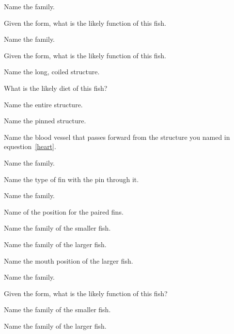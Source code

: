 \documentclass{exam}
\begin{document}
\begin{questions}

{\Large 
\question Name the family.

\question Given the form, what is the likely function of this fish.
\vspace{2\baselineskip}


\question Name the family.

\question Given the form, what is the likely function of this fish.
\vspace{2\baselineskip}


% 
\question Name the long, coiled structure.

\question What is the likely diet of this fish?
\vspace{2\baselineskip}


\question \label{heart}Name the entire structure.

\question Name the pinned structure.

\question Name the blood vessel that passes forward from the structure you named in equestion~\ref{heart}.
\vspace{2\baselineskip}


\question Name the family.

\question Name the type of fin with the pin through it.
\vspace{2\baselineskip}


\question Name the family.

\question Name of the position for the paired fins.
\vspace{2\baselineskip}


\question Name the family of the smaller fish.

\question Name the family of the larger fish.

\question Name the mouth position of the larger fish.
\vspace{2\baselineskip}

\newpage

\question Name the family.

\question Given the form, what is the likely function of this fish?
\vspace{2\baselineskip}


\question Name the family of the smaller fish.

\question Name the family of the larger fish.
\vspace{2\baselineskip}

}
\end{questions}
\end{document}
